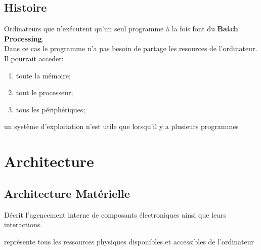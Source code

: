 \documentclass{article}
\begin{document}
\subsection{Histoire}
\begin{definition}\label{def:batchProcessing}
    Ordinateurs que n'exécutent qu'un seul programme à la fois font du \textbf{Batch Processing}.\\
    
    Dans ce cas le programme n'a pas besoin de partage les resources de l'ordinateur. Il pourrait acceder:
    \begin{enumerate}[noitemsep]
        \item toute la mémoire;
        \item tout le processeur;
        \item tous les périphériques;
    \end{enumerate}

    \begin{phrase}
        un système d'exploitation n'est utile que lorsqu'il y a plusieurs programmes
    \end{phrase}
\end{definition}

\section{Architecture}
\subsection{Architecture Matérielle}
\begin{definition}\label{def:architectureMaterielle}
    Décrit l'agencement interne de composants électroniques ainsi que leurs interactions.

    \begin{phrase}
        représente tous les ressources physiques disponibles et accessibles de l'ordinateur
    \end{phrase}
\end{definition}
\end{document}
